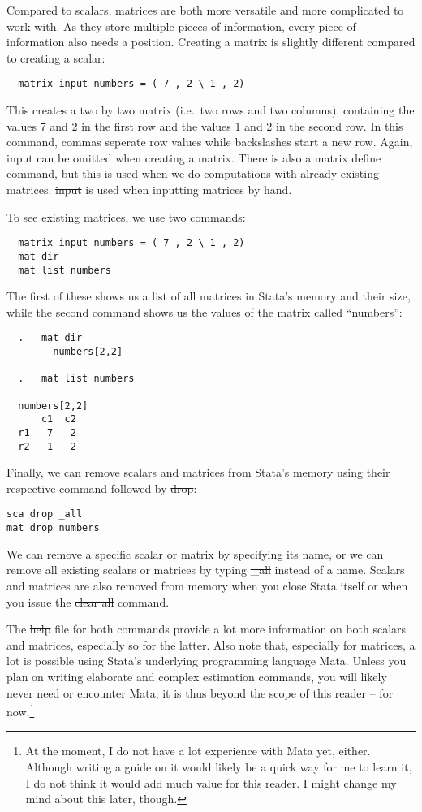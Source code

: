 Compared to scalars, matrices are both more versatile and more complicated to work with.
As they store multiple pieces of information, every piece of information also needs a position.
Creating a matrix is slightly different compared to creating a scalar:
\begin{verbatim}
  matrix input numbers = ( 7 , 2 \ 1 , 2)
\end{verbatim}
This creates a two by two matrix (i.e.\ two rows and two columns),
containing the values 7 and 2 in the first row and the values 1 and 2 in the second row.
In this command, commas seperate row values while backslashes start a new row.
Again, \st{input} can be omitted when creating a matrix.
There is also a \st{matrix define} command,
but this is used when we do computations with already existing matrices.
\st{input} is used when inputting matrices by hand.

To see existing matrices, we use two commands:
\begin{verbatim}
  matrix input numbers = ( 7 , 2 \ 1 , 2)
  mat dir
  mat list numbers
\end{verbatim}
The first of these shows us a list of all matrices in Stata's memory and their size,
while the second command shows us the values of the matrix called ``numbers'':
\small\begin{verbatim}
  .   mat dir
        numbers[2,2]

  .   mat list numbers

  numbers[2,2]
      c1  c2
  r1   7   2
  r2   1   2
\end{verbatim}\normalsize

Finally,
we can remove scalars and matrices from Stata's memory using their respective command followed by \st{drop}:
\begin{verbatim}
sca drop _all
mat drop numbers
\end{verbatim}
We can remove a specific scalar or matrix by specifying its name,
or we can remove all existing scalars or matrices by typing \st{_all} instead of a name.
Scalars and matrices are also removed from memory when you close Stata itself or when you issue the \st{clear all} command.

The \st{help} file for both commands provide a lot more information on both scalars and matrices, especially so for the latter.
Also note that, especially for matrices, a lot is possible using Stata's underlying programming language Mata.
Unless you plan on writing elaborate and complex estimation commands,
you will likely never need or encounter Mata;
it is thus beyond the scope of this reader -- for now.\footnote{At the moment, I do not have a lot experience with Mata yet, either. Although writing a guide on it would likely be a quick way for me to learn it, I do not think it would add much value for this reader. I might change my mind about this later, though.}

